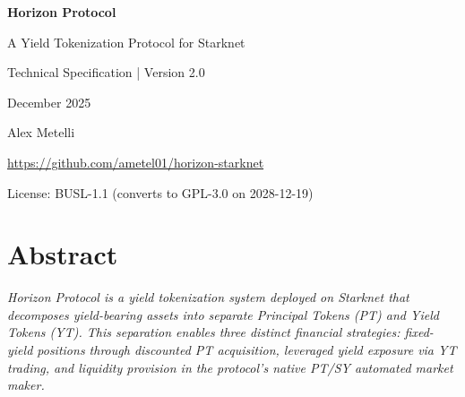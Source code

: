 \documentclass[12pt,a4paper]{report}
\theoremstyle{plain}
\theoremstyle{definition}
\theoremstyle{remark}
\begin{document}

\thispagestyle{empty}

\vspace*{50pt}

\begin{center}
  {\LARGE\bfseries Horizon Protocol}

  \vspace{20pt}

  {\Large A Yield Tokenization Protocol for Starknet}

  \vspace{40pt}

  {\large Technical Specification | Version 2.0}

  \vspace{60pt}

  {\normalsize December 2025}

  \vspace{30pt}

  {\normalsize Alex Metelli}

  \vspace{10pt}

  {\small \url{https://github.com/ametel01/horizon-starknet}}

  \vspace{40pt}

  {\footnotesize License: BUSL-1.1 (converts to GPL-3.0 on 2028-12-19)}
\end{center}

\vfill

\clearpage


\chapter*{Abstract}

\itshape
Horizon Protocol is a yield tokenization system deployed on Starknet that decomposes yield-bearing assets into separate Principal Tokens (PT) and Yield Tokens (YT). This separation enables three distinct financial strategies: fixed-yield positions through discounted PT acquisition, leveraged yield exposure via YT trading, and liquidity provision in the protocol's native PT/SY automated market maker.
\end{document}
